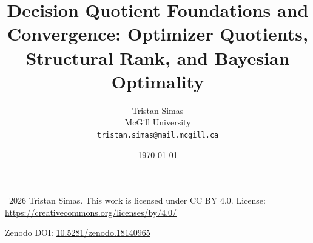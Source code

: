 \documentclass[11pt]{article}
\title{Decision Quotient Foundations and Convergence: Optimizer Quotients, Structural Rank, and Bayesian Optimality}
\author{
  Tristan Simas\\
  McGill University\\
  \texttt{tristan.simas@mail.mcgill.ca}
}
\date{\today}
\begin{document}
\maketitle

\begingroup
\footnotesize
\noindent\textcopyright\ 2026 Tristan Simas.
This work is licensed under CC BY 4.0.
License: \url{https://creativecommons.org/licenses/by/4.0/}
\par
\noindent Zenodo DOI: \href{https://doi.org/10.5281/zenodo.18140965}{10.5281/zenodo.18140965}
\par
\endgroup

\begin{abstract}

\end{abstract}











\end{document}
